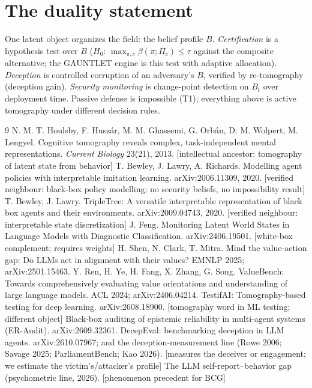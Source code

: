 \documentclass[11pt]{article}
\begin{document}
\section{The duality statement}

One latent object organizes the field: the belief profile $B$.
\emph{Certification} is a hypothesis test over $B$ ($H_0$: $\max_{\pi,c} \beta(\pi;\Pi_c) \leq \tau$ against the composite alternative; the GAUNTLET engine is this test with adaptive allocation). \emph{Deception} is controlled corruption of an adversary's $B$, verified by re-tomography (deception gain). \emph{Security monitoring} is change-point detection on $B_t$ over deployment time. Passive defense is impossible (T1); everything above is active tomography under different decision rules.

\begin{thebibliography}{9}\small
{} N. M. T. Houlsby, F. Husz\'ar, M. M. Ghassemi, G. Orb\'an, D. M. Wolpert, M. Lengyel. Cognitive tomography reveals complex, task-independent mental representations. \emph{Current Biology} 23(21), 2013. [intellectual ancestor: tomography of latent state from behavior]
 T. Bewley, J. Lawry, A. Richards. Modelling agent policies with interpretable imitation learning. arXiv:2006.11309, 2020. [verified neighbour: black-box policy modelling; no security beliefs, no impossibility result]
 T. Bewley, J. Lawry. TripleTree: A versatile interpretable representation of black box agents and their environments. arXiv:2009.04743, 2020. [verified neighbour: interpretable state discretization]
 J. Feng. Monitoring Latent World States in Language Models with Diagnostic Classification. arXiv:2406.19501. [white-box complement; requires weights]
 H. Shen, N. Clark, T. Mitra. Mind the value-action gap: Do LLMs act in alignment with their values? EMNLP 2025; arXiv:2501.15463.
 Y. Ren, H. Ye, H. Fang, X. Zhang, G. Song. ValueBench: Towards comprehensively evaluating value orientations and understanding of large language models. ACL 2024; arXiv:2406.04214.
 TestifAI: Tomography-based testing for deep learning. arXiv:2608.18900. [tomography word in ML testing; different object]
 Black-box auditing of epistemic reliability in multi-agent systems (ER-Audit). arXiv:2609.32361.
 DecepEval: benchmarking deception in LLM agents. arXiv:2610.07967; and the deception-measurement line (Rowe 2006; Savage 2025; ParliamentBench; Kao 2026). [measures the deceiver or engagement; we estimate the victim's/attacker's profile]
 The LLM self-report--behavior gap (psychometric line, 2026). [phenomenon precedent for BCG]
\end{thebibliography}
\end{document}
